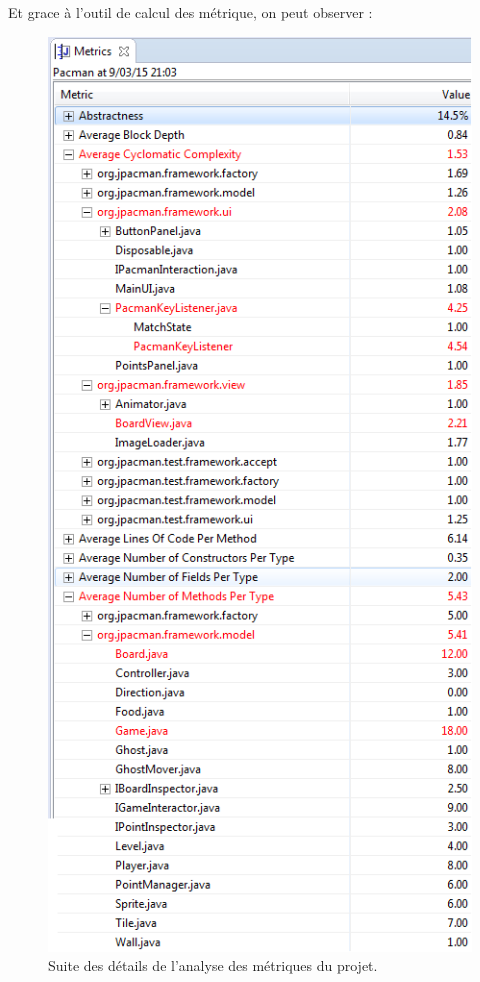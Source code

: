 \documentclass[12pt,a4paper,final]{article}
\begin{document}
Et grace à l'outil de calcul des métrique, on peut observer : 
\begin{figure}[!h]
	\centering
	\includegraphics{Metrique.png}
	\caption{\label{métrique0}Suite des détails de l'analyse des métriques du projet.}
\end{figure}
\end{document}
